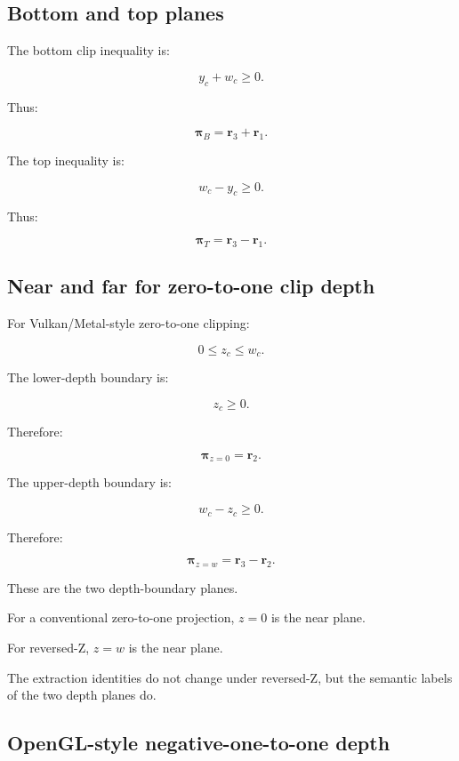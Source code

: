 \subsection{Bottom and top planes}\label{02-foundations-ii-ch034-bottom-and-top-planes}

The bottom clip inequality is:

\[
 y_c+w_c\ge0.
\]

Thus:

\[
 \boxed{ \boldsymbol\pi_B=\mathbf r_3+\mathbf r_1 }.
\]

The top inequality is:

\[
 w_c-y_c\ge0.
\]

Thus:

\[
 \boxed{ \boldsymbol\pi_T=\mathbf r_3-\mathbf r_1 }.
\]

\subsection{Near and far for zero-to-one clip depth}\label{02-foundations-ii-ch034-near-and-far-for-zero-to-one-clip-depth}

For Vulkan/Metal-style zero-to-one clipping:

\[
 0\le z_c\le w_c.
\]

The lower-depth boundary is:

\[
 z_c\ge0.
\]

Therefore:

\[
 \boxed{ \boldsymbol\pi_{z=0}=\mathbf r_2 }.
\]

The upper-depth boundary is:

\[
 w_c-z_c\ge0.
\]

Therefore:

\[
 \boxed{ \boldsymbol\pi_{z=w}=\mathbf r_3-\mathbf r_2 }.
\]

These are the two depth-boundary planes.

For a conventional zero-to-one projection, \(z=0\) is the near plane.

For reversed-Z, \(z=w\) is the near plane.

The extraction identities do not change under reversed-Z, but the semantic labels of the two depth planes do.

\subsection{OpenGL-style negative-one-to-one depth}\label{02-foundations-ii-ch034-opengl-style-negative-one-to-one-depth}

